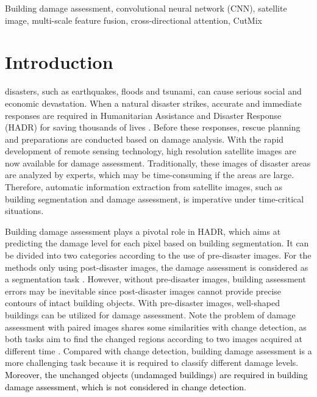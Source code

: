 \documentclass[journal]{IEEEtran}
\begin{document}
\begin{IEEEkeywords}
Building damage assessment, convolutional neural network (CNN), satellite image, multi-scale feature fusion, cross-directional attention, CutMix
\end{IEEEkeywords}


\IEEEpeerreviewmaketitle


\section{Introduction}
\label{SecIntro}
 disasters, such as earthquakes, floods and tsunami, can cause serious social and economic devastation. When a natural disaster strikes, accurate and immediate responses are required in Humanitarian Assistance and Disaster Response (HADR) for saving thousands of lives \cite{pierdiccaTripleCollocationAssess2018, yamaguchiSensitiveDamageDetection2019, graff2020wildfire, engelSeasonalWindowEnsembleBasedThresholding2020}.  Before these responses, rescue planning and preparations are conducted based on damage analysis. With the rapid development of remote sensing technology, high resolution satellite images are now available for damage assessment. Traditionally, these images of disaster areas are analyzed by experts, which may be time-consuming if the areas are large. Therefore, automatic information extraction from satellite images, such as building segmentation and damage assessment, is imperative under time-critical situations. 



Building damage assessment plays a pivotal role in HADR, which aims at predicting the damage level for each pixel based on building segmentation. It can be divided into two categories according to the use of pre-disaster images. For the methods only using post-disaster images, the damage assessment is considered as a segmentation task \cite{ciAssessmentDegreeBuilding2019,nexStructuralBuildingDamage2019}. 
However, without pre-disaster images, building assessment errors may be inevitable since post-disaster images cannot provide precise contours of intact building objects.  With  pre-disaster images, well-shaped buildings can be utilized for damage assessment. Note the problem of damage assessment with paired images shares some similarities with change detection, as both tasks aim to find the changed regions according to two images acquired at different time \cite{zhuChangeDetectionUsing2017,tewkesburyCriticalSynthesisRemotely2015, chinIntelligentRealTimeEarthquake2020}. Compared with change detection, building damage assessment is a more challenging task because it is required to classify different damage levels. \textcolor{black}{Moreover, the unchanged objects (undamaged buildings) are required in building damage assessment, which is not considered in change detection}.
\end{document}
